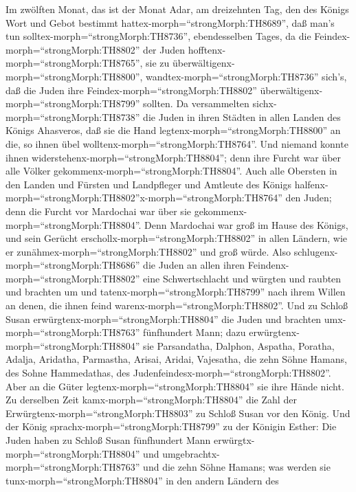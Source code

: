  Im zwölften Monat, das ist der Monat Adar, am dreizehnten
Tag, den des Königs Wort und Gebot bestimmt
hattex-morph=``strongMorph:TH8689'', daß man's tun
solltex-morph=``strongMorph:TH8736'', ebendesselben Tages, da die
Feindex-morph=``strongMorph:TH8802'' der Juden
hofftenx-morph=``strongMorph:TH8765'', sie zu
überwältigenx-morph=``strongMorph:TH8800'',
wandtex-morph=``strongMorph:TH8736'' sich's, daß die Juden ihre
Feindex-morph=``strongMorph:TH8802''
überwältigenx-morph=``strongMorph:TH8799'' sollten.  Da
versammelten sichx-morph=``strongMorph:TH8738'' die Juden in ihren
Städten in allen Landen des Königs Ahasveros, daß sie die Hand
legtenx-morph=``strongMorph:TH8800'' an die, so ihnen übel
wolltenx-morph=``strongMorph:TH8764''. Und niemand konnte ihnen
widerstehenx-morph=``strongMorph:TH8804''; denn ihre Furcht war über
alle Völker gekommenx-morph=``strongMorph:TH8804''.  Auch
alle Obersten in den Landen und Fürsten und Landpfleger und Amtleute des
Königs
halfenx-morph=``strongMorph:TH8802''x-morph=``strongMorph:TH8764'' den
Juden; denn die Furcht vor Mardochai war über sie
gekommenx-morph=``strongMorph:TH8804''.  Denn Mardochai war
groß im Hause des Königs, und sein Gerücht
erschollx-morph=``strongMorph:TH8802'' in allen Ländern, wie er
zunähmex-morph=``strongMorph:TH8802'' und groß würde.  Also
schlugenx-morph=``strongMorph:TH8686'' die Juden an allen ihren
Feindenx-morph=``strongMorph:TH8802'' eine Schwertschlacht und würgten
und raubten und brachten um und tatenx-morph=``strongMorph:TH8799'' nach
ihrem Willen an denen, die ihnen feind
warenx-morph=``strongMorph:TH8802''.  Und zu Schloß Susan
erwürgtenx-morph=``strongMorph:TH8804'' die Juden und brachten
umx-morph=``strongMorph:TH8763'' fünfhundert Mann;  dazu
erwürgtenx-morph=``strongMorph:TH8804'' sie Parsandatha, Dalphon,
Aspatha,  Poratha, Adalja, Aridatha,  Parmastha,
Arisai, Aridai, Vajesatha,  die zehn Söhne Hamans, des
Sohne Hammedathas, des Judenfeindesx-morph=``strongMorph:TH8802''. Aber
an die Güter legtenx-morph=``strongMorph:TH8804'' sie ihre Hände nicht.
 Zu derselben Zeit kamx-morph=``strongMorph:TH8804'' die
Zahl der Erwürgtenx-morph=``strongMorph:TH8803'' zu Schloß Susan vor den
König.  Und der König sprachx-morph=``strongMorph:TH8799''
zu der Königin Esther: Die Juden haben zu Schloß Susan fünfhundert Mann
erwürgtx-morph=``strongMorph:TH8804'' und
umgebrachtx-morph=``strongMorph:TH8763'' und die zehn Söhne Hamans; was
werden sie tunx-morph=``strongMorph:TH8804'' in den andern Ländern des
